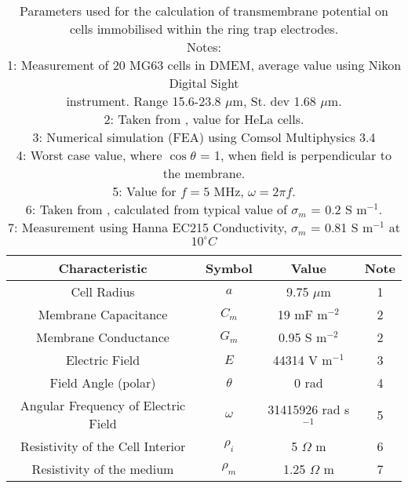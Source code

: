 \begin{table}[b]
	\centering
		\begin{tabular} {c c c c}
		\hline
		Characteristic & Symbol & Value & Note\\
		\hline
		Cell Radius & $ a $ & 9.75 $\mu$m & 1 \\
		Membrane Capacitance & $ C_{m} $ & 19 mF m$^{-2}$ & 2 \\
		Membrane Conductance & $ G_{m} $ & 0.95 S m$^{-2}$ & 2 \\
		Electric Field  & $ E $ & 44314 V m$^{-1}$ & 3 \\
		Field Angle (polar) & $ \theta $ &  0 rad  & 4 \\
		Angular Frequency of Electric Field & $ \omega $ & 31415926 rad s$^{-1}$ & 5 \\
		Resistivity of the Cell Interior & $ \rho _{i} $ &  5 $ \Omega $ m & 6 \\
		Resistivity of the medium  & $ \rho _{m} $ & 1.25 $ \Omega $ m & 7 \\
		\hline			
		\end{tabular}
		\captionsetup{justification=justified}
	\caption[Parameters used for the calculation of transmembrane potential.]{Parameters used for the calculation of transmembrane potential on cells immobilised within the ring trap electrodes.\\
	\hspace*{0.3cm} Notes:\\
	1: Measurement of 20 MG63 cells in DMEM, average value using Nikon Digital Sight \\
		\hspace*{0.3cm} instrument. Range 15.6-23.8 $\mu$m, St. dev 1.68 $\mu$m. \\
	2: Taken from \cite{Asami:1990}, value for HeLa cells.\\
	3: Numerical simulation (FEA) using Comsol Multiphysics 3.4\\
	4: Worst case value, where $\cos \theta$ = 1, when field is perpendicular to the membrane.\\
	5: Value for $f = 5$ MHz, $\omega = 2\pi f$.\\
	6: Taken from \cite{Kotnik:1997}, calculated from typical value of $\sigma _{m}$ = 0.2 S m$^{-1}$.\\
	7: Measurement using Hanna EC215 Conductivity, $\sigma _{m}$ = 0.81 S m$^{-1}$ at $10^{\circ}C$
		}

	\label{tab:transmembrane_potential_calculation_parameters}
\end{table}

